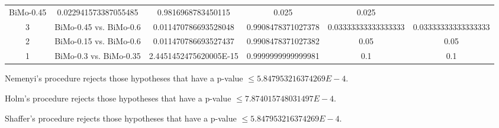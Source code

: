 \documentclass[a4paper,10pt]{article}
\begin{document}
\begin{landscape}
\begin{table}[!htp]
\begin{tabular}{cccccc}
BiMo-0.45&0.022941573387055485&0.9816968783450115&0.025&0.025\\3&BiMo-0.45 vs. BiMo-0.6&0.011470786693528048&0.9908478371027378&0.03333333333333333&0.03333333333333333\\2&BiMo-0.15 vs. BiMo-0.6&0.011470786693527437&0.9908478371027382&0.05&0.05\\1&BiMo-0.3 vs. BiMo-0.35&2.4451452475620005E-15&0.9999999999999981&0.1&0.1\\\hline
\end{tabular}
\end{table}
Nemenyi's procedure rejects those hypotheses that have a p-value $\le5.847953216374269E-4$.


Holm's procedure rejects those hypotheses that have a p-value $\le7.874015748031497E-4$.


Shaffer's procedure rejects those hypotheses that have a p-value $\le5.847953216374269E-4$.



\end{landscape}
\end{document}
